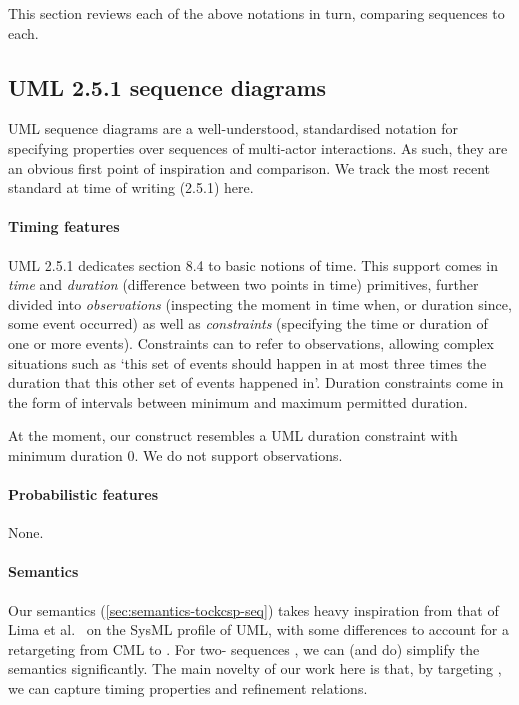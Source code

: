 
This section reviews each of the above notations in turn, comparing
\langname{} sequences to each.

\subsection{UML 2.5.1 sequence diagrams}

UML sequence diagrams are a well-understood, standardised notation for
specifying properties over sequences of multi-actor interactions.  As such, they
are an obvious first point of inspiration and comparison.  We track the most
recent standard at time of writing (2.5.1) here.

\paragraph{Timing features}
UML 2.5.1 dedicates section 8.4 to basic notions of time.  This
support comes in \emph{time} and \emph{duration} (difference between two points
in time) primitives, further divided into \emph{observations} (inspecting the
moment in time when, or duration since, some event occurred) as well as
\emph{constraints} (specifying the time or duration of one or more events).
Constraints can to refer to observations, allowing complex situations such as
`this set of events should happen in at most three times the duration that
this other set of events happened in'.  Duration constraints come in the
form of intervals between minimum and maximum permitted duration.

At the moment, our \mdeadlinestep{} construct resembles a UML duration
constraint with minimum duration \(0\).  We do not support observations.

\paragraph{Probabilistic features}
None.  

\paragraph{Semantics}
Our semantics (\cref{sec:semantics-tockcsp-seq}) takes heavy inspiration from
that of Lima et al.~\cite{lima-semantics} on the SysML profile of UML, with
some differences to account for a retargeting from CML to \tockcsp.  For
two-\mactor{} sequences , we can (and do)
simplify the semantics significantly.
The main novelty of our work here is that, by targeting \tockcsp, we can capture
timing properties and refinement relations.

